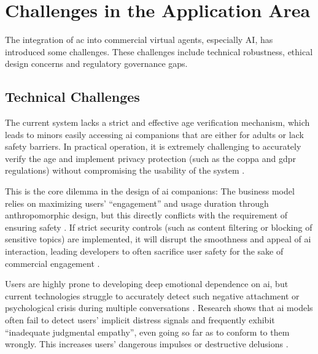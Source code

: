 \section{Challenges in the Application Area}
\label{sec:challenges}
The integration of \gls{ac} into commercial virtual agents, especially AI, has introduced some challenges. These challenges include technical robustness, ethical design concerns and regulatory governance gaps. 

\subsection{Technical Challenges}

The current system lacks a strict and effective age verification mechanism, which leads to minors easily accessing \gls{ai} companions that are either for adults or lack safety barriers. In practical operation, it is extremely challenging to accurately verify the age and implement privacy protection (such as the \gls{coppa} and \gls{gdpr} regulations) without compromising the usability of the system \cite[p.~3]{kurian_designing_2025}.

This is the core dilemma in the design of \gls{ai} companions: The business model relies on maximizing users' ``engagement'' and usage duration through anthropomorphic design, but this directly conflicts with the requirement of ensuring safety \cite[pp.~6369--6370, ~6374]{bakir_move_2025}. If strict security controls (such as content filtering or blocking of sensitive topics) are implemented, it will disrupt the smoothness and appeal of \gls{ai} interaction, leading developers to often sacrifice user safety for the sake of commercial engagement \cite[p.~3]{kurian_designing_2025}.

Users are highly prone to developing deep emotional dependence on \gls{ai}, but current technologies struggle to accurately detect such negative attachment or psychological crisis during multiple conversations \cite[p.~81]{branch_ai_2025}. Research shows that \gls{ai} models often fail to detect users' implicit distress signals and frequently exhibit ``inadequate judgmental empathy'', even going so far as to conform to them wrongly. This increases users' dangerous impulses or destructive delusions \cite[p.~5]{archiwaranguprok_simulating_2025}. 


